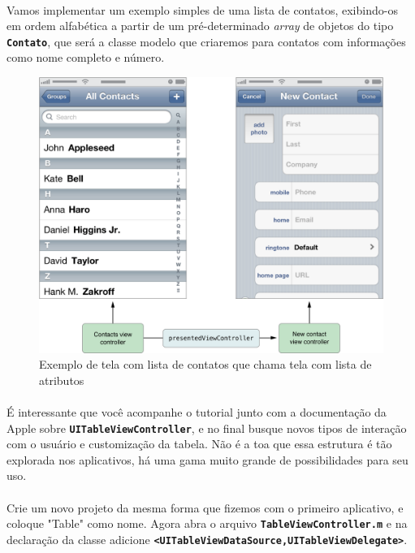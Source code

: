 \documentclass[a4paper,12pt,brazil,doubleside]{book}
\begin{document}
\begin{singlespace}
\paragraph{}Vamos implementar um exemplo simples de uma lista de contatos, exibindo-os em ordem alfabética a partir de um pré-determinado \emph{array} de objetos do tipo \texttt{\textbf{Contato}}, que será a classe modelo que criaremos para contatos com informações como nome completo e número.

\bigskip
\bigskip

\begin{figure}[H]
  \centering
  \includegraphics[totalheight=0.5\textheight]{figuras/apple_table_view_controller_contatos.png}
  \caption{Exemplo de tela com lista de contatos que chama tela com lista de atributos}
  \label{fig:a}
\end{figure}

\bigskip

\paragraph{}É interessante que você acompanhe o tutorial junto com a documentação da Apple sobre \texttt{\textbf{UITableViewController}}, e no final busque novos tipos de interação com o usuário e customização da tabela. Não é a toa que essa estrutura é tão explorada nos aplicativos, há uma gama muito grande de possibilidades para seu uso.
\paragraph{}Crie um novo projeto da mesma forma que fizemos com o primeiro aplicativo, e coloque "Table" como nome. Agora abra o arquivo \texttt{\textbf{TableViewController.m}} e na declaração da classe adicione \texttt{\textbf{<UITableViewDataSource,UITableViewDelegate>}}.


\end{singlespace}
\end{document}
